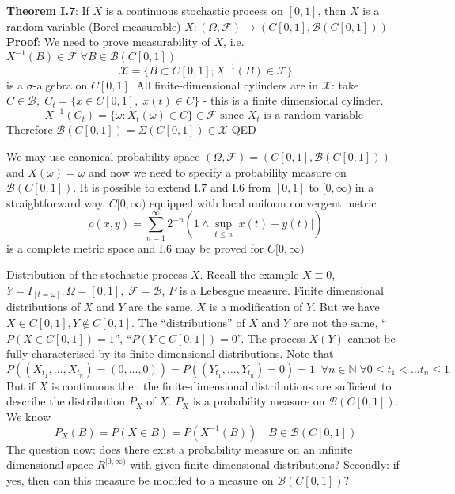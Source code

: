 \documentclass[english]{article}
\newcommand{\N}{\mathbb{N}}
\newcommand{\note}[1]{\noindent\textbf{#1}}
\newcommand{\F}{\mathcal F}
\newcommand{\B}{\mathcal B}
\begin{document}
\note{Theorem I.7}: If $X$ is a continuous stochastic process on $[0,1]$, then $X$ is a random variable (Borel measurable) $X:(\Omega, \F) \to (C[0,1], \B(C[0,1]))$ \newline
\textbf{Proof}: We need to prove measurability of $X$, i.e. $X^{-1} (B) \in \F \;\forall B\in\B(C[0,1])$
$$\mathcal X = \{B\subset C[0,1]; X^{-1}(B) \in \F\}$$
is a $\sigma$-algebra on $C[0,1]$. \newline
All finite-dimensional cylinders are in $\mathcal X$: take $C\in\B,\; C_t = \{x \in C[0,1],\; x(t)\in C\}$ - this is a finite dimensional cylinder.
$$X^{-1}(C_t)=\{ \omega: X_t(\omega) \in C \}\in \F \text{ since } X_t \text { is a random variable }$$
Therefore $\B(C[0,1]) = \Sigma(C[0,1]) \in \mathcal X$ \newline
QED \newline

We may use canonical probability space $(\Omega, \F) = (C[0,1], \B(C[0,1]))$ and $X(\omega) = \omega$ and now we need to specify a probability measure on $\B(C[0,1])$.\newline
It is possible to extend I.7 and I.6 from $[0,1]$ to $[0,\infty)$ in a straightforward way. $C[0,\infty)$ equipped with local uniform convergent metric
$$\rho(x,y) = \sum^\infty_{n=1} 2^{-n} (1\wedge \sup_{t\leq n} |x(t) - y(t)|)$$
is a complete metric space and I.6 may be proved for $C[0,\infty)$\newline

\noindent Distribution of the stochastic process $X$. \newline
Recall the example $X\equiv 0$, $Y=I_{[t=\omega]}, \Omega = [0,1],\; \F=\B$, $P$ is a Lebesgue measure. Finite dimensional distributions of $X$ and $Y$ are the same. $X$ is a modification of $Y$. But we have $X\in C[0,1], Y\notin C[0,1]$. The ``distributions'' of $X$ and $Y$ are not the same, ``$P(X\in C[0,1])=1$'', ``$P(Y\in C[0,1])=0$''. The process $X(Y)$ cannot be fully characterised by its finite-dimensional distributions.\newline
Note that
$$P((X_{t_1}, \dots, X_{t_n}) = (0,\dots, 0)) = P((Y_{t_1}, \dots, Y_{t_n})=0) = 1 \;\; \forall n\in \N\; \forall 0\leq t_1<\dots t_n \leq 1$$
But if $X$ is continuous then the finite-dimensional distributions are sufficient to describe the distribution $P_X$ of $X$. $P_X$ is a probability measure on $\B(C[0,1])$. We know
$$P_X(B) = P(X\in B) = P(X^{-1} (B))\quad B\in\B(C[0,1])$$
The question now: does there exist a probability measure on an infinite dimensional space $R^{[0,\infty)}$ with given finite-dimensional distributions? \newline
Secondly: if yes, then can this measure be modifed to a measure on $\B(C[0,1])$? \newline
\end{document}

